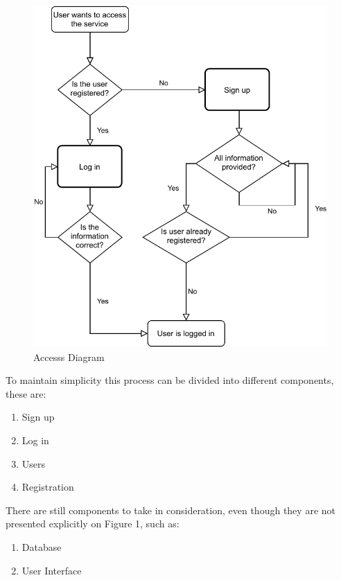 \documentclass{article}
\begin{document}
\begin{figure}[h!]
    \centering
    \includegraphics[scale=0.75]{Images/AccessDiagram.pdf}
    \caption{Accesss Diagram}
    \label{fig:figure 1}
\end{figure}

\vspace{200}

To maintain simplicity this process can be divided into different components, these are:

\begin{enumerate}
  \item Sign up
  \item Log in
  \item Users
  \item Registration
\end{enumerate}

There are still components to take in consideration, even though they are not presented explicitly on Figure 1, such as:
\begin{enumerate}
  \item Database
  \item User Interface
\end{enumerate}
\end{document}
